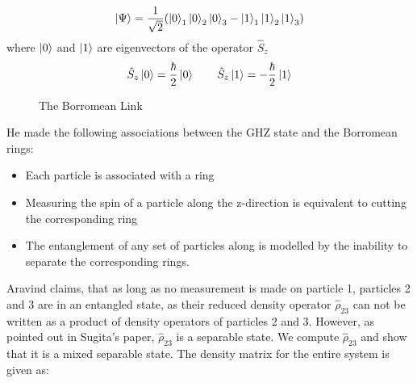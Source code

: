 \documentclass{scrartcl}
\begin{document}
\[
\ket{\Psi} = \frac{1}{\sqrt{2}} (\ket{0}_1\ket{0}_2\ket{0}_3 - \ket{1}_1\ket{1}_2\ket{1}_3)
\]
where $\ket{0}$ and $\ket{1}$ are eigenvectors of the operator $\hat{S}_z$
\[
\hat{S}_z\ket{0} = \frac{\hbar}{2}\ket{0}\qquad
\hat{S}_z\ket{1} = -\frac{\hbar}{2}\ket{1}
\]
\begin{figure}[H]
    \centering
   \scalebox{0.8}{ }
   \caption{The Borromean Link}
\end{figure}
\noindent
He made the following associations between the GHZ state and the Borromean rings:

\begin{itemize}
    \item Each particle is associated with a ring
    \item Measuring the spin of a particle along the z-direction is equivalent to cutting the corresponding ring
    \item The entanglement of any set of particles along is modelled by the inability to separate the corresponding rings.
\end{itemize}
Aravind claims, that as long as no measurement is made on particle 1, particles 2 and 3 are in an entangled state, as their reduced density operator $\hat{\rho}_{23}$ can not be written as a product of density operators of particles 2 and 3. However, as pointed out in Sugita's paper, $\hat{\rho}_{23}$ is a separable state. We compute $\hat{\rho}_{23}$ and show that it is a mixed separable state. The density matrix for the entire system is given as:
\end{document}
